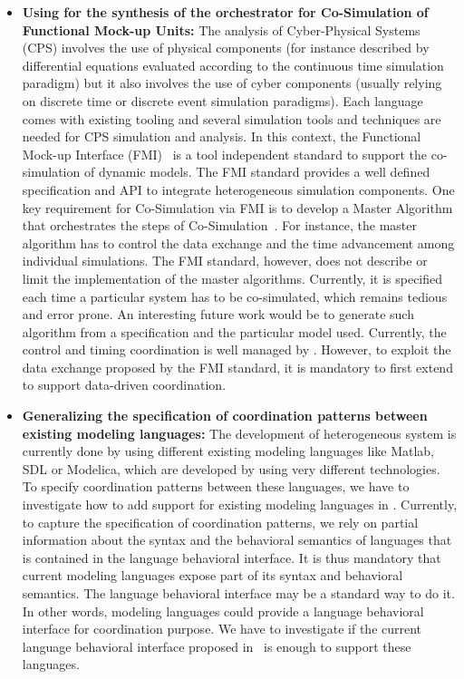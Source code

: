 \begin{itemize}
	\item \textbf{Using \bcool for the synthesis of the orchestrator for Co-Simulation of Functional Mock-up Units:} The analysis of Cyber-Physical Systems (CPS) involves the use of physical components (for instance described by differential equations evaluated according to the continuous time simulation paradigm) but it also involves the use of cyber components (usually relying on discrete time or discrete event simulation paradigms). Each language comes with existing tooling and several simulation tools and techniques are needed for CPS simulation and analysis. In this context, the Functional Mock-up Interface (FMI)~\cite{fmibib2} is a tool independent standard to support the co-simulation of dynamic models. The FMI standard provides a well defined specification and API to integrate heterogeneous simulation components. One key requirement for Co-Simulation via FMI is to develop a Master Algorithm that orchestrates the steps of Co-Simulation~\cite{fmibib}. For instance, the master algorithm has to control the data exchange and the time advancement among individual simulations. The FMI standard, however, does not describe or limit the implementation of the master algorithms. Currently, it is specified each time a particular system has to be co-simulated, which remains tedious and error prone. An interesting future work would be to generate such algorithm from a \bcool specification and the particular model used. Currently, the control and timing coordination is well managed by \bcool. However, to exploit the data exchange proposed by the FMI standard, it is mandatory to first extend \bcool to support data-driven coordination. 
	
	\item \textbf{Generalizing the specification of coordination patterns between existing modeling languages:} The development of heterogeneous system is currently done by using different existing modeling languages like Matlab, SDL or Modelica, which are developed by using very different technologies. To specify coordination patterns between these languages, we have to investigate how to add support for existing modeling languages in \bcool. Currently, to capture the specification of coordination patterns, we rely on partial information about the syntax and the behavioral semantics of languages that is contained in the language behavioral interface. It is thus mandatory that current modeling languages expose part of its syntax and behavioral semantics. The language behavioral interface may be a standard way to do it. In other words, modeling languages could provide a language behavioral interface for coordination purpose. We have to investigate if the current language behavioral interface proposed in~\cite{sle13-combemale} is enough to support these languages.    
				

\end{itemize}
